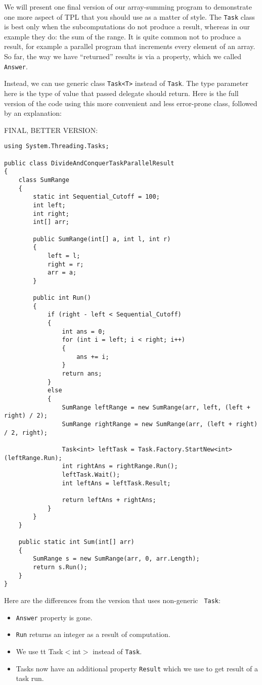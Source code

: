 \documentclass[10pt]{article}
\begin{document}
We will present one final version of our array-summing program to demonstrate 
one more aspect of TPL that you should use as a matter of style. The {\tt Task} 
class is best only when the subcomputations do not produce a result, whereas 
in our example they do: the sum of the range. It is quite common not to produce 
a result, for example a parallel program that increments every element of an 
array. So far, the way we have “returned” results is via a property, 
which we called {\tt Answer}.

Instead, we can use generic class {\tt Task<T>} instead of {\tt Task}. The type 
parameter here is the type of value that passed delegate should return. 
Here is the full version of the code using this more convenient and less 
error-prone class, followed by an explanation:

\medskip
\noindent FINAL, BETTER VERSION:

\begin{verbatim}
using System.Threading.Tasks;

public class DivideAndConquerTaskParallelResult
{
    class SumRange
    {
        static int Sequential_Cutoff = 100;
        int left;
        int right;
        int[] arr;

        public SumRange(int[] a, int l, int r)
        {
            left = l;
            right = r;
            arr = a;
        }

        public int Run()
        {
            if (right - left < Sequential_Cutoff)
            {
                int ans = 0;
                for (int i = left; i < right; i++)
                {
                    ans += i;
                }
                return ans;
            }
            else
            {
                SumRange leftRange = new SumRange(arr, left, (left + right) / 2);
                SumRange rightRange = new SumRange(arr, (left + right) / 2, right);

                Task<int> leftTask = Task.Factory.StartNew<int>(leftRange.Run);
                int rightAns = rightRange.Run();
                leftTask.Wait();
                int leftAns = leftTask.Result;

                return leftAns + rightAns;
            }
        }
    }

    public static int Sum(int[] arr)
    {
        SumRange s = new SumRange(arr, 0, arr.Length);
        return s.Run();
    }
}
\end{verbatim}

Here are the differences from the version that uses non-generic {\tt
  Task}:
\begin{itemize}
\item {\tt Answer} property is gone.
\item {\tt Run} returns an integer as a result of computation.
\item We use {tt Task$<$int$>$} instead of {\tt Task}.
\item Tasks now have an additional property {\tt Result} which we 
 use to get result of a task run.
\end{itemize}
\end{document}
